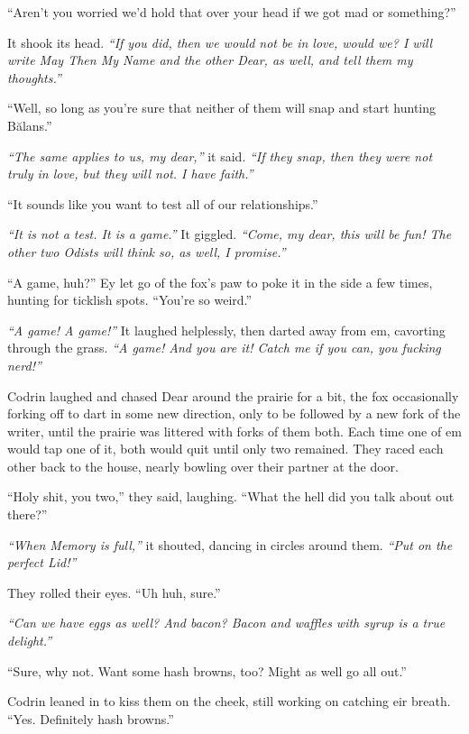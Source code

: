 ``Aren't you worried we'd hold that over your head if we got mad or something?''

It shook its head. \emph{``If you did, then we would not be in love, would we? I will write May Then My Name and the other Dear, as well, and tell them my thoughts.''}

``Well, so long as you're sure that neither of them will snap and start hunting Bălans.''

\emph{``The same applies to us, my dear,''} it said. \emph{``If they snap, then they were not truly in love, but they will not. I have faith.''}

``It sounds like you want to test all of our relationships.''

\emph{``It is not a test. It is a game.''} It giggled. \emph{``Come, my dear, this will be fun! The other two Odists will think so, as well, I promise.''}

``A game, huh?'' Ey let go of the fox's paw to poke it in the side a few times, hunting for ticklish spots. ``You're so weird.''

\emph{``A game! A game!''} It laughed helplessly, then darted away from em, cavorting through the grass. \emph{``A game! And you are it! Catch me if you can, you fucking nerd!''}

Codrin laughed and chased Dear around the prairie for a bit, the fox occasionally forking off to dart in some new direction, only to be followed by a new fork of the writer, until the prairie was littered with forks of them both. Each time one of em would tap one of it, both would quit until only two remained. They raced each other back to the house, nearly bowling over their partner at the door.

``Holy shit, you two,'' they said, laughing. ``What the hell did you talk about out there?''

\emph{``When Memory is full,''} it shouted, dancing in circles around them. \emph{``Put on the perfect Lid!''}

They rolled their eyes. ``Uh huh, sure.''

\emph{``Can we have eggs as well? And bacon? Bacon and waffles with syrup is a true delight.''}

``Sure, why not. Want some hash browns, too? Might as well go all out.''

Codrin leaned in to kiss them on the cheek, still working on catching eir breath. ``Yes. Definitely hash browns.''
